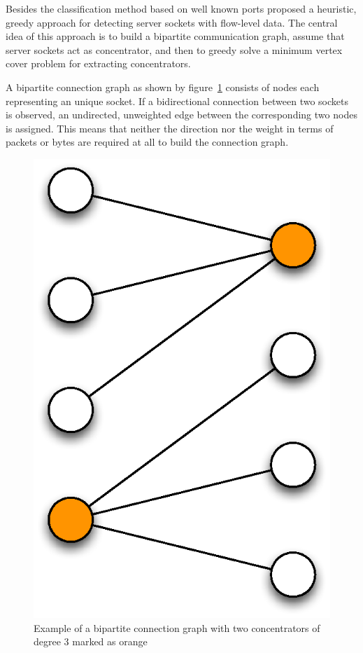 Besides the classification method based on well known ports
\citet{Schatzmann:Mining,Schatzmann:Dissection,Schatzmann:Tracing} proposed a
heuristic, greedy approach for detecting \glspl{server socket} with flow-level
data. The central idea of this approach is to build a bipartite communication
graph, assume that server sockets act as concentrator, and then to greedy solve
a minimum vertex cover problem for extracting concentrators.

A bipartite connection graph as shown by figure \ref{fig:bipartite_graph}
consists of nodes each representing an unique socket. If a bidirectional
connection between two sockets is observed, an undirected, unweighted edge
between the corresponding two nodes is assigned. This means that neither the
direction nor the weight in terms of packets or bytes are required at all to
build the connection graph.

\begin{figure}
	[h] \centering
	\includegraphics[width=\linewidth/3]{images/connection_graph.eps} \caption{Example of a bipartite connection graph with two concentrators of degree 3 marked as orange}
	\label{fig:bipartite_graph}
\end{figure}

